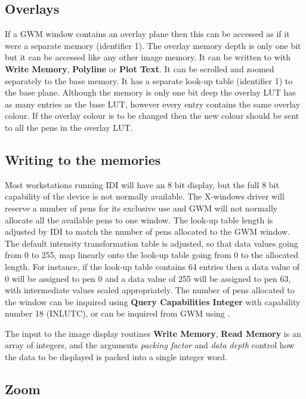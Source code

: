 \documentclass[11pt,nolof]{starlink}
\begin{document}
\subsection{Overlays}

If a GWM window contains an overlay plane then this can be accessed as
if it were a separate memory (identifier 1). The overlay memory depth
is only one bit but it can be accessed like any other image memory.
It can be written to with \textbf{Write Memory}, \textbf{Polyline} or
\textbf{Plot Text}. It can be scrolled and zoomed separately to the base
memory. It has a separate look-up table (identifier 1) to the base
plane. Although the memory is only one bit deep the overlay LUT has as
many entries as the base LUT, however every entry contains the same
overlay colour. If the overlay colour is to be changed then the new
colour should be sent to all the pens in the overlay LUT.

\subsection{Writing to the memories}

Most workstations running IDI will have an 8 bit display, but the
full 8 bit capability of the device is not normally available. The
X-windows driver will reserve a number of pens for its exclusive use
and GWM will not normally allocate all the available pens to one
window. The look-up table length is adjusted by IDI to match the
number of pens allocated to the GWM window. The default intensity
transformation table is adjusted, so that data values going from 0 to
255, map linearly onto the look-up table going from 0 to the allocated
length. For instance, if the look-up table contains 64 entries then a data
value of 0 will be assigned to pen 0 and a data value of 255 will be assigned
to pen 63, with intermediate values scaled appropriately.
The number of pens allocated to the window can be inquired using
\textbf{Query Capabilities Integer} with capability number 18 (INLUTC),
or can be inquired from GWM using .

The input to the image display routines \textbf{Write Memory}, \textbf{Read Memory}
is an array of integers, and the arguments \textit{packing factor} and
\textit{data depth} control how the data to be displayed is packed into a
single integer word.

\subsection{Zoom}
\end{document}
